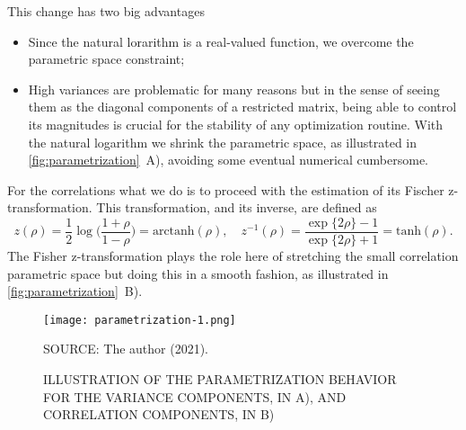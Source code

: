 This change has two big advantages
\begin{itemize}
 \item Since the natural lorarithm is a real-valued function, we
       overcome the parametric space constraint;
 \item High variances are problematic for many reasons but in the sense
       of seeing them as the diagonal components of a restricted matrix,
       being able to control its magnitudes is crucial for the stability
       of any optimization routine. With the natural logarithm we shrink
       the parametric space, as illustrated in
       \autoref{fig:parametrization}~A), avoiding some eventual
       numerical cumbersome.
\end{itemize}
For the correlations what we do is to proceed with the estimation of its
Fischer z-transformation. This transformation, and its inverse, are
defined as
\[
 z(\rho) = \frac{1}{2}\log\Big(\frac{1+\rho}{1-\rho}\Big)
         = \text{arctanh}(\rho),\quad
 z^{-1}(\rho) = \frac{\exp\{2\rho\}-1}{\exp\{2\rho\}+1}
             = \text{tanh}(\rho).
\]
The Fisher z-transformation plays the role here of stretching the small
correlation parametric space but doing this in a smooth fashion, as
illustrated in \autoref{fig:parametrization}~B).

\begin{figure}[H]
 \setlength{\abovecaptionskip}{.0001pt}
 \caption{ILLUSTRATION OF THE PARAMETRIZATION BEHAVIOR FOR THE VARIANCE
          COMPONENTS, IN A), AND CORRELATION COMPONENTS, IN B)}
 \vspace{0.3cm}\centering
 \texttt{[image: parametrization-1.png]}
 \\
 \vspace{0.1cm}
 \begin{footnotesize}
  SOURCE: The author (2021).
 \end{footnotesize}
 \label{fig:parametrization}
\end{figure}

